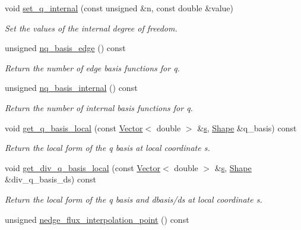 \begin{DoxyCompactItemize}
void \hyperlink{classoomph_1_1TRaviartThomasDarcyElement_a651973d516923c2c032f44dac1503b60}{set\+\_\+q\+\_\+internal} (const unsigned \&n, const double \&value)
\begin{DoxyCompactList}\small\item\em Set the values of the internal degree of freedom. \end{DoxyCompactList}\item 
unsigned \hyperlink{classoomph_1_1TRaviartThomasDarcyElement_af8ab0d926cdbb46da734e4db8461a2e5}{nq\+\_\+basis\+\_\+edge} () const
\begin{DoxyCompactList}\small\item\em Return the number of edge basis functions for q. \end{DoxyCompactList}\item 
unsigned \hyperlink{classoomph_1_1TRaviartThomasDarcyElement_aeff07bf55d4794ab817827c367ec49f8}{nq\+\_\+basis\+\_\+internal} () const
\begin{DoxyCompactList}\small\item\em Return the number of internal basis functions for q. \end{DoxyCompactList}\item 
void \hyperlink{classoomph_1_1TRaviartThomasDarcyElement_a16c5506831abea90f801a4db7022d6a3}{get\+\_\+q\+\_\+basis\+\_\+local} (const \hyperlink{classoomph_1_1Vector}{Vector}$<$ double $>$ \&\hyperlink{cfortran_8h_ab7123126e4885ef647dd9c6e3807a21c}{s}, \hyperlink{classoomph_1_1Shape}{Shape} \&q\+\_\+basis) const
\begin{DoxyCompactList}\small\item\em Return the local form of the q basis at local coordinate s. \end{DoxyCompactList}\item 
void \hyperlink{classoomph_1_1TRaviartThomasDarcyElement_a6cbe24cce6930993cba8200964816919}{get\+\_\+div\+\_\+q\+\_\+basis\+\_\+local} (const \hyperlink{classoomph_1_1Vector}{Vector}$<$ double $>$ \&\hyperlink{cfortran_8h_ab7123126e4885ef647dd9c6e3807a21c}{s}, \hyperlink{classoomph_1_1Shape}{Shape} \&div\+\_\+q\+\_\+basis\+\_\+ds) const
\begin{DoxyCompactList}\small\item\em Return the local form of the q basis and dbasis/ds at local coordinate s. \end{DoxyCompactList}\item 
unsigned \hyperlink{classoomph_1_1TRaviartThomasDarcyElement_aee9de4e429ee7852f960a9cf80bfe4fc}{nedge\+\_\+flux\+\_\+interpolation\+\_\+point} () const

\end{DoxyCompactItemize}
